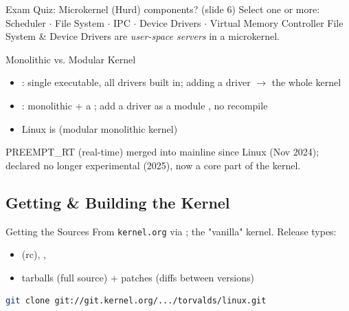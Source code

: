 \multend

\begin{example2}{Exam Quiz: Microkernel (Hurd) components? (slide 6)}
    Select one or more: Scheduler $\cdot$ File System $\cdot$ IPC $\cdot$
    Device Drivers $\cdot$ Virtual Memory Controller
    \tcblower
    File System \& Device Drivers are \emph{user-space servers} in a microkernel.
\end{example2}

\begin{definition}{Monolithic vs. Modular Kernel}
    \begin{itemize}
        \item {}: single executable, all drivers built in; adding
              a driver $\to$  the whole kernel
        \item {}: monolithic + a ; add a
              driver as a module , no recompile
        \item Linux is  (modular monolithic kernel)
    \end{itemize}
\end{definition}

\begin{remark}
     PREEMPT\_RT (real-time) merged into mainline since Linux
     (Nov 2024);  declared no longer experimental
    (2025), now a core part of the kernel.
\end{remark}

\subsection{Getting \& Building the Kernel}


\begin{definition}{Getting the Sources}
    From \texttt{kernel.org} via ; the "vanilla" kernel.
    Release types:
    \begin{itemize}
        \item {} (rc), , 
        \item tarballs (full source) + patches (diffs between versions)
    \end{itemize}
\begin{lstlisting}[language=bash, style=basesmol, aboveskip=2pt, belowskip=2pt]
git clone git://git.kernel.org/.../torvalds/linux.git
\end{lstlisting}
\end{definition}

